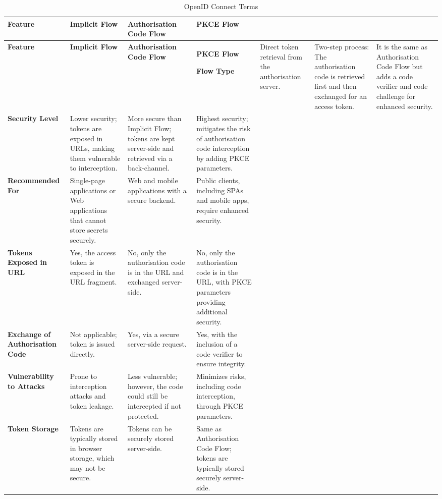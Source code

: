 \begin{longtable}{|>{\raggedright\arraybackslash}p{4cm}|>{\raggedright\arraybackslash}p{3.5cm}|>{\raggedright\arraybackslash}p{3.5cm}|>{\raggedright\arraybackslash}p{3.5cm}|}
    \caption{OpenID Connect Terms}
    \label{table:oauth_terms}
\hline
{}
\textbf{Feature} & \textbf{Implicit Flow} & \textbf{Authorisation Code Flow} & \textbf{PKCE Flow} \\ \hline
\endfirsthead
\hline
{}
\textbf{Feature} & \textbf{Implicit Flow} & \textbf{Authorisation Code Flow} & \textbf{PKCE Flow} 
\endhead
\hline
\endfoot
\hline
\endlastfoot

\textbf{Flow Type} & Direct token retrieval from the authorisation server. & Two-step process: The authorisation code is retrieved first and then exchanged for an access token. & It is the same as Authorisation Code Flow but adds a code verifier and code challenge for enhanced security. \\ \hline
\textbf{Security Level} & Lower security; tokens are exposed in URLs, making them vulnerable to interception. & More secure than Implicit Flow; tokens are kept server-side and retrieved via a back-channel. & Highest security; mitigates the risk of authorisation code interception by adding PKCE parameters. \\ \hline
\textbf{Recommended For} & Single-page applications or Web applications that cannot store secrets securely. & Web and mobile applications with a secure backend. & Public clients, including SPAs and mobile apps, require enhanced security. \\ \hline
\textbf{Tokens Exposed in URL} & Yes, the access token is exposed in the URL fragment. & No, only the authorisation code is in the URL and exchanged server-side. & No, only the authorisation code is in the URL, with PKCE parameters providing additional security. \\ \hline
\textbf{Exchange of Authorisation Code} & Not applicable; token is issued directly. & Yes, via a secure server-side request. & Yes, with the inclusion of a code verifier to ensure integrity. \\ \hline
\textbf{Vulnerability to Attacks} & Prone to interception attacks and token leakage. & Less vulnerable; however, the code could still be intercepted if not protected. & Minimizes risks, including code interception, through PKCE parameters. \\ \hline
\textbf{Token Storage} & Tokens are typically stored in browser storage, which may not be secure. & Tokens can be securely stored server-side. & Same as Authorisation Code Flow; tokens are typically stored securely server-side. \\ \hline
\end{longtable}
\endgroup

